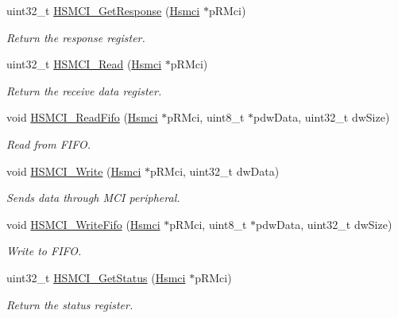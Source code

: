 \begin{DoxyCompactItemize}
uint32\+\_\+t \mbox{\hyperlink{group__hsmci__functions_gafb6f3467813115f494f67c125f821264}{H\+S\+M\+C\+I\+\_\+\+Get\+Response}} (\mbox{\hyperlink{structHsmci}{Hsmci}} $\ast$p\+R\+Mci)
\begin{DoxyCompactList}\small\item\em Return the response register. \end{DoxyCompactList}\item 
uint32\+\_\+t \mbox{\hyperlink{group__hsmci__functions_ga51401f15d5a9979beb4be951d13ee9b6}{H\+S\+M\+C\+I\+\_\+\+Read}} (\mbox{\hyperlink{structHsmci}{Hsmci}} $\ast$p\+R\+Mci)
\begin{DoxyCompactList}\small\item\em Return the receive data register. \end{DoxyCompactList}\item 
void \mbox{\hyperlink{group__hsmci__functions_gaf4700a730c2105820baeeab5b02e1776}{H\+S\+M\+C\+I\+\_\+\+Read\+Fifo}} (\mbox{\hyperlink{structHsmci}{Hsmci}} $\ast$p\+R\+Mci, uint8\+\_\+t $\ast$pdw\+Data, uint32\+\_\+t dw\+Size)
\begin{DoxyCompactList}\small\item\em Read from F\+I\+FO. \end{DoxyCompactList}\item 
void \mbox{\hyperlink{group__hsmci__functions_gacaabbc538539863298c3f2db59a2f894}{H\+S\+M\+C\+I\+\_\+\+Write}} (\mbox{\hyperlink{structHsmci}{Hsmci}} $\ast$p\+R\+Mci, uint32\+\_\+t dw\+Data)
\begin{DoxyCompactList}\small\item\em Sends data through M\+CI peripheral. \end{DoxyCompactList}\item 
void \mbox{\hyperlink{group__hsmci__functions_ga2e01ee1c7cd331ecdadd5ad251c5ba2c}{H\+S\+M\+C\+I\+\_\+\+Write\+Fifo}} (\mbox{\hyperlink{structHsmci}{Hsmci}} $\ast$p\+R\+Mci, uint8\+\_\+t $\ast$pdw\+Data, uint32\+\_\+t dw\+Size)
\begin{DoxyCompactList}\small\item\em Write to F\+I\+FO. \end{DoxyCompactList}\item 
uint32\+\_\+t \mbox{\hyperlink{group__hsmci__functions_ga7395ec7b356ef056f786107518137a56}{H\+S\+M\+C\+I\+\_\+\+Get\+Status}} (\mbox{\hyperlink{structHsmci}{Hsmci}} $\ast$p\+R\+Mci)
\begin{DoxyCompactList}\small\item\em Return the status register. \end{DoxyCompactList}\item 

\end{DoxyCompactItemize}
